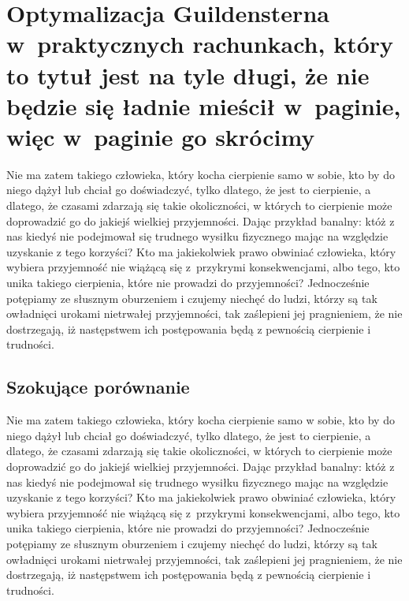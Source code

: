 \documentclass[12pt]{mwbk}
\theoremstyle{plain}
\theoremstyle{definition}
\theoremstyle{remark}
\begin{document}
\chapter[Optymalizacja Guildensterna w~praktycznych rachunkach\ldots]{Optymalizacja 
Guildensterna w~praktycznych rachunkach, który to tytuł jest na tyle długi, 
że nie będzie się ładnie mieścił w~paginie, więc w~paginie go skrócimy}

Nie ma zatem takiego człowieka, który kocha cierpienie samo w sobie, 
kto by do niego dążył lub chciał go doświadczyć, tylko dlatego, że
jest to cierpienie, a dlatego, że czasami zdarzają się takie 
okoliczności, w których to cierpienie może doprowadzić 
go do jakiejś wielkiej przyjemności. 
Dając przykład banalny: któż z nas kiedyś nie podejmował 
się trudnego wysiłku fizycznego mając na względzie 
uzyskanie z tego korzyści? 
Kto ma jakiekolwiek prawo obwiniać człowieka, 
który wybiera przyjemność nie wiążącą się z~przykrymi 
konsekwencjami, albo tego, kto unika takiego cierpienia, 
które nie prowadzi do przyjemności? 
Jednocześnie potępiamy ze słusznym oburzeniem i czujemy 
niechęć do ludzi, którzy są tak owładnięci urokami nietrwałej 
przyjemności, tak zaślepieni jej pragnieniem, 
że nie dostrzegają, iż następstwem ich 
postępowania będą z pewnością cierpienie i trudności.


\section{Szokujące porównanie}
Nie ma zatem takiego człowieka, który kocha cierpienie samo w sobie, 
kto by do niego dążył lub chciał go doświadczyć, tylko dlatego, że
jest to cierpienie, a dlatego, że czasami zdarzają się takie 
okoliczności, w których to cierpienie może doprowadzić 
go do jakiejś wielkiej przyjemności. 
Dając przykład banalny: któż z nas kiedyś nie podejmował 
się trudnego wysiłku fizycznego mając na względzie 
uzyskanie z tego korzyści? 
Kto ma jakiekolwiek prawo obwiniać człowieka, 
który wybiera przyjemność nie wiążącą się z~przykrymi 
konsekwencjami, albo tego, kto unika takiego cierpienia, 
które nie prowadzi do przyjemności? 
Jednocześnie potępiamy ze słusznym oburzeniem i czujemy 
niechęć do ludzi, którzy są tak owładnięci urokami nietrwałej 
przyjemności, tak zaślepieni jej pragnieniem, 
że nie dostrzegają, iż następstwem ich 
postępowania będą z pewnością cierpienie i trudności.
\end{document}

